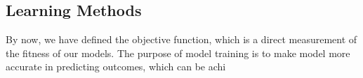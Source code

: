 \subsection {Learning Methods}
By now, we have defined the objective function, which is a direct measurement of the fitness of our models. The purpose of model training is to make model more accurate in predicting outcomes, which can be achi